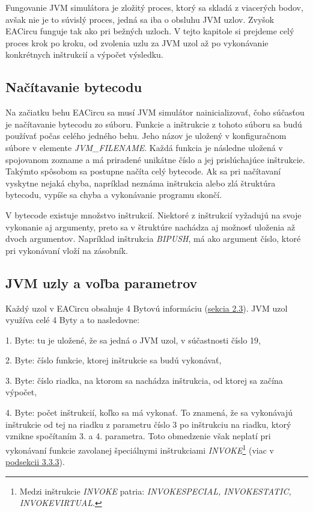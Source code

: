 Fungovanie JVM simulátora je zložitý proces, ktorý sa skladá z viacerých bodov, avšak nie je to súvislý proces, jedná sa iba o obsluhu JVM uzlov. Zvyšok EACircu funguje tak ako pri bežných uzloch. V tejto kapitole si prejdeme celý proces krok po kroku, od zvolenia uzlu za JVM uzol až po vykonávanie konkrétnych inštrukcií a výpočet výsledku. 

\subsection{Načítavanie bytecodu}
\label{parsing-bytecode}

Na začiatku behu EACircu sa musí JVM simulátor nainicializovať, čoho súčasťou je načítavanie bytecodu zo súboru. Funkcie a inštrukcie z tohoto súboru sa budú používať počas celého jedného behu. Jeho názov je uložený v konfiguračnom súbore v elemente \textit{JVM\_FILENAME}. Každá funkcia je následne uložená v spojovanom zozname a má priradené unikátne číslo a jej prislúchajúce inštrukcie. Takýmto spôsobom sa postupne načíta celý bytecode. Ak sa pri načítavaní vyskytne nejaká chyba, napríklad neznáma inštrukcia alebo zlá štruktúra bytecodu, vypíše sa chyba a vykonávanie programu skončí.

V bytecode existuje množstvo inštrukcií. Niektoré z inštrukcií vyžadujú na svoje vykonanie aj argumenty, preto sa v štruktúre nachádza aj možnosť uloženia až dvoch argumentov. Napríklad inštrukcia \textit{BIPUSH}, má ako argument číslo, ktoré pri vykonávaní vloží na zásobník.

\subsection{JVM uzly a voľba parametrov}
\label{subsec:jvm-nodes}

Každý uzol v EACircu obsahuje 4 Bytovú informáciu (\hyperref[sec:nodes]{sekcia 2.3}). JVM uzol využíva celé 4 Byty a to nasledovne: \vspace{0pt}

\begin{myItemize}
	\item 1. Byte: tu je uložené, že sa jedná o JVM uzol, v súčastnosti číslo 19,
	\item 2. Byte: číslo funkcie, ktorej inštrukcie sa budú vykonávať,
	\item 3. Byte: číslo riadka, na ktorom sa nachádza inštrukcia, od ktorej sa začína výpočet,
	\item 4. Byte: počet inštrukcií, koľko sa má vykonať. To znamená, že sa vykonávajú inštrukcie od tej na riadku z parametru číslo 3 po inštrukciu na riadku, ktorý vznikne spočítaním 3. a 4. parametra. Toto obmedzenie však neplatí pri vykonávaní funkcie zavolanej špeciálnymi inštrukciami \textit{INVOKE}\footnote{Medzi inštrukcie \textit{INVOKE} patria: \textit{INVOKESPECIAL, INVOKESTATIC, INVOKEVIRTUAL}.} (viac v \hyperref[subsec:emulating-ins]{podsekcii 3.3.3}). 
\end{myItemize}

